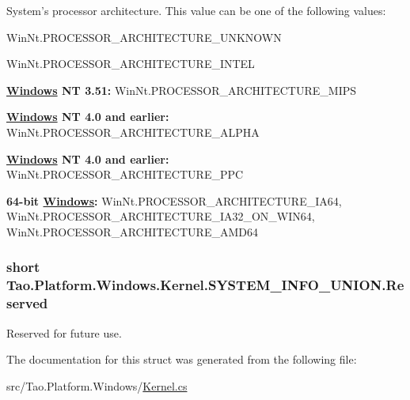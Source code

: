 System's processor architecture. This value can be one of the following values: 

WinNt.PROCESSOR\_\-ARCHITECTURE\_\-UNKNOWN 

WinNt.PROCESSOR\_\-ARCHITECTURE\_\-INTEL 

{\bfseries \hyperlink{namespace_tao_1_1_platform_1_1_windows}{Windows} NT 3.51:} WinNt.PROCESSOR\_\-ARCHITECTURE\_\-MIPS 

{\bfseries \hyperlink{namespace_tao_1_1_platform_1_1_windows}{Windows} NT 4.0 and earlier:} WinNt.PROCESSOR\_\-ARCHITECTURE\_\-ALPHA 

{\bfseries \hyperlink{namespace_tao_1_1_platform_1_1_windows}{Windows} NT 4.0 and earlier:} WinNt.PROCESSOR\_\-ARCHITECTURE\_\-PPC 

{\bfseries 64-\/bit \hyperlink{namespace_tao_1_1_platform_1_1_windows}{Windows}:} WinNt.PROCESSOR\_\-ARCHITECTURE\_\-IA64, WinNt.PROCESSOR\_\-ARCHITECTURE\_\-IA32\_\-ON\_\-WIN64, WinNt.PROCESSOR\_\-ARCHITECTURE\_\-AMD64 

\hypertarget{struct_tao_1_1_platform_1_1_windows_1_1_kernel_1_1_s_y_s_t_e_m___i_n_f_o___u_n_i_o_n_adfb1716ec09e2b0ceb6edf6e32d8a2fc}{
\subsubsection[{Reserved}]{\setlength{\rightskip}{0pt plus 5cm}short {\bf Tao.Platform.Windows.Kernel.SYSTEM\_\-INFO\_\-UNION.Reserved}}}
\label{struct_tao_1_1_platform_1_1_windows_1_1_kernel_1_1_s_y_s_t_e_m___i_n_f_o___u_n_i_o_n_adfb1716ec09e2b0ceb6edf6e32d8a2fc}


Reserved for future use. 



The documentation for this struct was generated from the following file:\begin{DoxyCompactItemize}
\item 
src/Tao.Platform.Windows/\hyperlink{_kernel_8cs}{Kernel.cs}\end{DoxyCompactItemize}
